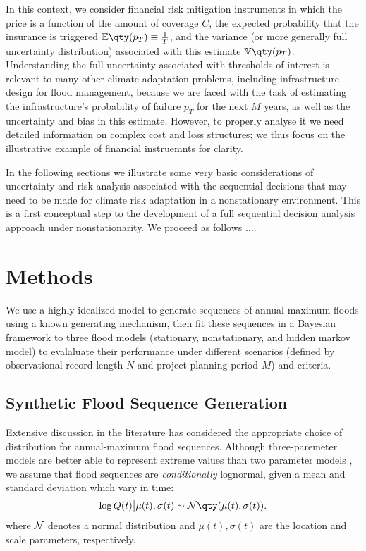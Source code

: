 \documentclass[11pt]{article}
\begin{document}
In this context, we consider financial risk mitigation instruments in which the price is a function of the amount of coverage $C$, the expected probability that the insurance is triggered $\expectation \qty(p_T) \equiv \frac{1}{T}$, and the variance (or more generally full uncertainty distribution) associated with this estimate $\variance \qty(p_T)$.
Understanding the full uncertainty associated with thresholds of interest is relevant to many other climate adaptation problems, including infrastructure design for flood management, because we are faced with the task of estimating the infrastructure's probability of failure $p_T$ for the next $M$ years, as well as the uncertainty and bias in this estimate.
However, to properly analyse it we need detailed information on complex cost and loss structures; we thus focus on the illustrative example of financial instruemnts for clarity.

In the following sections we illustrate some very basic considerations of uncertainty and risk analysis associated with the sequential decisions that may need to be made for climate risk adaptation in a nonstationary environment.
This is a first conceptual step to the development of a full sequential decision analysis approach under nonstationarity.
We proceed as follows $\ldots$.

\section{Methods} \label{sec:methods}

We use a highly idealized model to generate sequences of annual-maximum floods using a known generating mechanism, then fit these sequences in a Bayesian framework to three flood models (stationary, nonstationary, and hidden markov model) to evalaluate their performance under different scenarios (defined by observational record length $N$ and project planning period $M$) and criteria.

\subsection{Synthetic Flood Sequence Generation}


Extensive discussion in the literature has considered the appropriate choice of distribution for annual-maximum flood sequences.
Although three-paremeter models are better able to represent extreme values than two parameter models \citep{IACWD1982,Vogel1996}, we assume that flood sequences are \emph{conditionally} lognormal, given a mean and standard deviation which vary in time:
\begin{equation} \label{eq:lognormal}
  \log Q(t) \big| \mu(t),\sigma(t) \sim \normal \qty(\mu(t), \sigma(t)).
\end{equation}
where $\mathcal{N}$ denotes a normal distribution and $\mu(t), \sigma(t)$ are the location and scale parameters, respectively.
\end{document}
